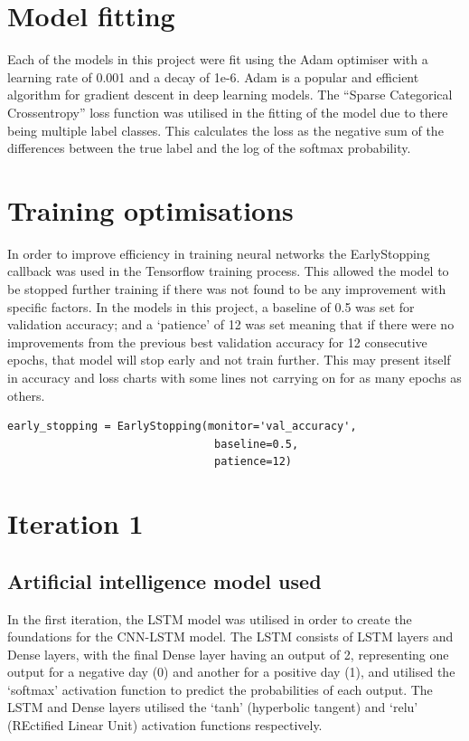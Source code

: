 \section{Model fitting}\label{sec:model_fitting}
Each of the models in this project were fit using the Adam optimiser with a learning rate of 0.001 and a decay of
1e-6. Adam is a popular and efficient algorithm for gradient descent in deep learning models.
The ``Sparse Categorical Crossentropy'' loss function was utilised in the fitting of the model due to there being multiple
label classes. This calculates the loss as the negative sum of the differences between the true label and the log of the softmax
probability.

\section{Training optimisations}
In order to improve efficiency in training neural networks the EarlyStopping callback was used in the
Tensorflow training process. This allowed the model to be stopped further training if there was not
found to be any improvement with specific factors. In the models in this project, a baseline of 0.5
was set for validation accuracy; and a `patience' of 12 was set meaning that if there were no
improvements from the previous best validation accuracy for 12 consecutive epochs, that model will
stop early and not train further. This may present itself in accuracy and loss charts with some lines
not carrying on for as many epochs as others.

\begin{verbatim}
early_stopping = EarlyStopping(monitor='val_accuracy', 
                                baseline=0.5,
                                patience=12)
\end{verbatim}

\section{Iteration 1}
\subsection{Artificial intelligence model used}\label{ssec:iteration1_ai_model}
In the first iteration, the LSTM model was utilised in order to create the foundations for the CNN-LSTM model. The LSTM
consists of LSTM layers and Dense layers, with the final Dense layer having an output of 2, representing one output for
a negative day (0) and another for a positive day (1), and utilised the `softmax' activation function to predict the
probabilities of each output. The LSTM and Dense layers utilised the `tanh' (hyperbolic tangent) and `relu'
(REctified Linear Unit) activation functions respectively.

